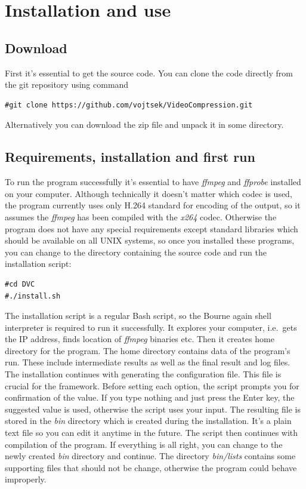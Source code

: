 \chapter{Installation and use}\label{installation-and-use}

\section{Download}\label{download}

First it's essential to get the source code. You can clone the code
directly from the git repository using command

\begin{verbatim}
#git clone https://github.com/vojtsek/VideoCompression.git
\end{verbatim}

Alternatively you can download the zip file and unpack it in some
directory.

\section{Requirements, installation and first
run}\label{requirements-installation-and-first-run}

To run the program successfully it's essential to have \textit{ffmpeg}
and \textit{ffprobe} installed on your computer. Although technically it
doesn't matter which codec is used, the program currently uses only
H.264 standard for encoding of the output, so it assumes the
\textit{ffmpeg} has been compiled with the \textit{x264} codec.
Otherwise the program does not have any special requirements except
standard libraries which should be available on all UNIX systems, so
once you installed these programs, you can change to the directory
containing the source code and run the installation script:

\begin{verbatim}
#cd DVC
#./install.sh
\end{verbatim}

The installation script is a regular Bash script, so the Bourne again
shell interpreter is required to run it successfully. It explores your
computer, i.e.~gets the IP address, finds location of \textit{ffmpeg}
binaries etc. Then it creates home directory for the program. The home
directory contains data of the program's run. These include intermediate
results as well as the final result and log files. The installation
continues with generating the configuration file. This file is crucial
for the framework. Before setting each option, the script prompts you
for confirmation of the value. If you type nothing and just press the
Enter key, the suggested value is used, otherwise the script uses your
input. The resulting file is stored in the \textit{bin} directory which
is created during the installation. It's a plain text file so you can
edit it anytime in the future. The script then continues with
compilation of the program. If everything is all right, you can change
to the newly created \textit{bin} directory and continue. The directory
\textit{bin/lists} contains some supporting files that should not be
change, otherwise the program could behave improperly.

